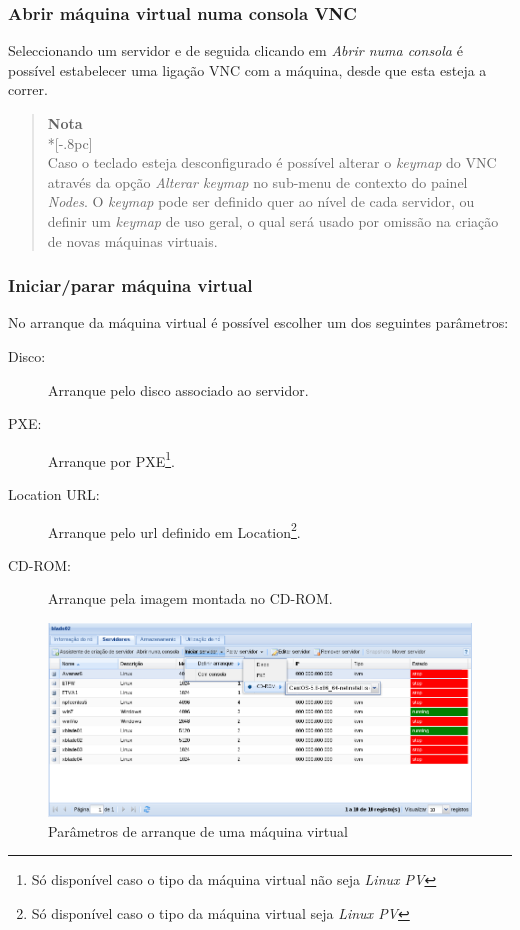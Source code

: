 \subsubsection{Abrir máquina virtual numa consola VNC}
\label{sec:open_vnc}

Seleccionando um servidor e de seguida clicando em \emph{Abrir numa consola} é possível estabelecer uma ligação VNC com a máquina, desde que esta esteja a correr.

\begin{quote}
	{\large \bf Nota} \\*[-.8pc]
	\underline{\hspace{6in}} \\
	Caso o teclado esteja desconfigurado é possível alterar o \emph{keymap} do VNC através da opção \emph{Alterar keymap} no sub-menu de contexto do painel \emph{Nodes}.
    O \emph{keymap} pode ser definido quer ao nível de cada servidor, ou definir um \emph{keymap} de uso geral, o qual será usado por omissão na criação de novas máquinas virtuais.
\end{quote}

\subsubsection{Iniciar/parar máquina virtual}
\label{sec:start_server}

No arranque da máquina virtual é possível escolher um dos seguintes parâmetros:
\begin{description}
	\item[Disco:] Arranque pelo disco associado ao servidor.
    \item[PXE:] Arranque por PXE\footnote{Só disponível caso o tipo da máquina virtual não seja \emph{Linux PV}\label{foot:notpv}}.
    \item[Location URL:] Arranque pelo url definido em Location\footnote{Só disponível caso o tipo da máquina virtual seja \emph{Linux PV}}.
	\item[CD-ROM:] Arranque pela imagem montada no CD-ROM.
    	 
\end{description}

\begin{figure}[H]
	\begin{center}
	\includegraphics[scale=0.45]{screenshots/server_start.png}
	\caption{Parâmetros de arranque de uma máquina virtual}
	\label{fig:server_start}
	\end{center}
\end{figure}

